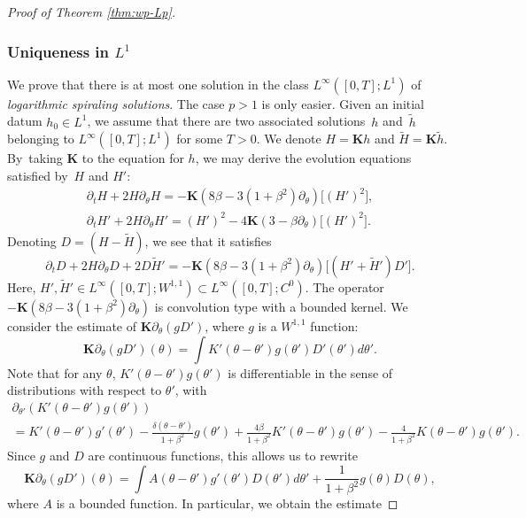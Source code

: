 \documentclass[JEP,XML,SOM,Unicode,NoFloatCountersInSection,published]{cedram}
\theoremstyle{plain}
\theoremstyle{definition}
\let\rd\partial
\let\bt\beta
\let\dlt\delta
\let\tht\theta
\newcommand{\bfK}{{\mathbf K}}
\begin{document}
\begin{proof}[Proof of Theorem \ref{thm:wp-Lp}]
\subsubsection{Uniqueness in $L^1$}
We prove that there is at most one solution in the class $L^\infty([0,T];L^1)$ of \textit{logarithmic spiraling solutions}. The case $p>1$ is only easier. Given an initial datum $h_0 \in L^1$, we assume that there are two associated solutions~$h$ and~$\tilde{h}$ belonging to $L^\infty([0,T];L^1)$ for some $T>0$. We denote $H = \bfK h$ and $\tilde{H} = \bfK\tilde{h}$. By~taking $\bfK$ to the equation for $h$, we may derive the evolution equations satisfied by~$H$ and $H'$:
\begin{align}\label{eq:H}
\rd_tH + 2H \rd_\tht H = -\bfK(8\bt - 3(1+\bt^2)\rd_\tht)\bigl[ (H')^2 \bigr],\\
\label{eq:H-prime}
\rd_t H' + 2H \rd_\tht H' = (H')^2 - 4 \bfK (3-\bt\rd_\tht)\bigl[ (H')^2 \bigr].
\end{align}
Denoting $D = (H-\tilde{H}) $, we see that it satisfies
\begin{equation}\label{eq:D}
\rd_t D + 2H \rd_\tht D + 2D\tilde{H}' = - \bfK(8\bt -3(1+\bt^2)\rd_\tht) \bigl[ (H'+ \tilde{H}')D' \bigr].
\end{equation}
Here, $H', \tilde{H}' \in L^\infty([0,T];W^{1,1}) \subset L^\infty([0,T];C^0)$. The operator $ - \bfK(8\bt -3(1+\bt^2)\rd_\tht) $ is convolution type with a bounded kernel. We consider the estimate of $\bfK\rd_\tht (g D')$, where $g$ is a $W^{1,1}$ function:
\begin{equation*}
\bfK\rd_\tht (g D')(\tht) = \int K'(\tht-\tht') g(\tht') D'(\tht') d\tht'.
\end{equation*}
Note that for any $\tht$, $K'(\tht-\tht') g(\tht')$ is differentiable in the sense of distributions with respect to $\tht'$, with
\begin{multline*}
\rd_{\tht'} \left(K'(\tht-\tht') g(\tht') \right)\\
= K'(\tht-\tht') g'(\tht') - \frac{\dlt(\tht-\tht')}{1+\bt^2}g(\tht') + \frac{4\bt}{1+\bt^2}K'(\tht-\tht')g(\tht') - \frac{4}{1+\bt^2}K(\tht-\tht') g(\tht').
\end{multline*} Since $g$ and $D$ are continuous functions, this allows us to rewrite
\begin{equation*}
\bfK\rd_\tht (g D')(\tht) = \int A(\tht-\tht')g'(\tht')D(\tht')d\tht' + \frac{1}{1+\bt^2} g(\tht) D(\tht),
\end{equation*}
where $A$ is a bounded function. In particular, we obtain the estimate

\end{proof}
\end{document}
